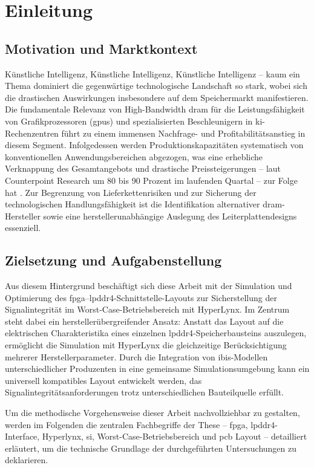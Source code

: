 \chapter{Einleitung}
\section{Motivation und Marktkontext}
Künstliche Intelligenz, Künstliche Intelligenz, Künstliche Intelligenz – kaum ein Thema dominiert die gegenwärtige technologische Landschaft so stark, wobei sich die drastischen Auswirkungen insbesondere auf dem Speichermarkt manifestieren. Die fundamentale Relevanz von High-Bandwidth \gls{dram} für die Leistungsfähigkeit von Grafikprozessoren (\gls{gpu}s) und spezialisierten Beschleunigern in \gls{ki}-Rechenzentren führt zu einem immensen Nachfrage- und Profitabilitätsanstieg in diesem Segment. Infolgedessen werden Produktionskapazitäten systematisch von konventionellen Anwendungsbereichen abgezogen, was eine erhebliche Verknappung des Gesamtangebots und drastische Preissteigerungen – laut Counterpoint Research um 80 bis 90 Prozent im laufenden Quartal – zur Folge hat \cite{spectrum_dram_shortage}. Zur Begrenzung von Lieferkettenrisiken und zur Sicherung der technologischen Handlungsfähigkeit ist die Identifikation alternativer \gls{dram}-Hersteller sowie eine herstellerunabhängige Auslegung des Leiterplattendesigns essenziell.

\section{Zielsetzung und Aufgabenstellung}
Aus diesem Hintergrund beschäftigt sich diese Arbeit mit der Simulation und Optimierung des \gls{fpga}–\gls{lpddr4}-Schnittstelle-Layouts zur Sicherstellung der Signalintegrität im Worst-Case-Betriebsbereich mit HyperLynx. Im Zentrum steht dabei ein herstellerübergreifender Ansatz: Anstatt das Layout auf die elektrischen Charakteristika eines einzelnen \gls{lpddr4}-Speicherbausteins auszulegen, ermöglicht die Simulation mit HyperLynx die gleichzeitige Berücksichtigung mehrerer Herstellerparameter. Durch die Integration von \gls{ibis}-Modellen unterschiedlicher Produzenten in eine gemeinsame Simulationsumgebung kann ein universell kompatibles Layout entwickelt werden, das Signalintegritätsanforderungen trotz unterschiedlichen Bauteilquelle erfüllt.

Um die methodische Vorgehensweise dieser Arbeit nachvollziehbar zu gestalten, werden im Folgenden die zentralen Fachbegriffe der These – \gls{fpga}, \gls{lpddr4}-Interface, Hyperlynx, \gls{si}, Worst-Case-Betriebsbereich und \gls{pcb} Layout – detailliert erläutert, um die technische Grundlage der durchgeführten Untersuchungen zu deklarieren.

